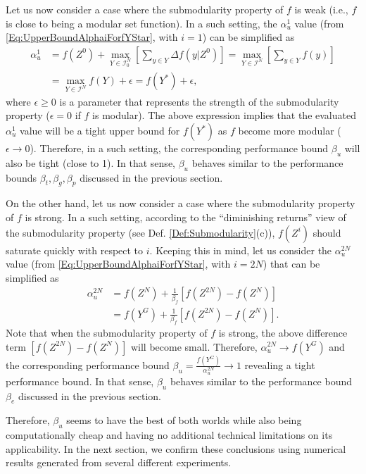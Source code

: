 \documentclass[conference]{IEEEtran}
\begin{document}
Let us now consider a case where the submodularity property of $f$ is weak (i.e., $f$ is close to being a modular set function). In a such setting, the $\alpha^1_u$ value (from \eqref{Eq:UpperBoundAlphaiForfYStar}, with $i=1$) can be simplified as
\begin{align}
    \alpha_u^1 
    &= f(Z^0)+\underset{Y\in\mathcal{I}^N_0}{\max}\left[\sum_{y\in Y}\Delta f(y\vert Z^0)\right] 
    = \underset{Y \in \mathcal{I}^N}{\max} \left[\sum_{y\in Y} f(y) \right]\nonumber \\
    &= \underset{Y \in \mathcal{I}^N}{\max} f(Y) + \epsilon = f(Y^*) + \epsilon, \nonumber
\end{align}
where $\epsilon\geq0$ is a parameter that represents the strength of the submodularity property ($\epsilon = 0$ if $f$ is modular). The above expression implies that the evaluated $\alpha_u^1$ value will be a tight upper bound for $f(Y^*)$ as $f$ become more modular ($\epsilon\rightarrow 0$). Therefore, in a such setting, the corresponding performance bound $\beta_u$ will also be tight (close to 1). In that sense, $\beta_u$ behaves similar to the performance bounds $\beta_t,\beta_g,\beta_p$ discussed in the previous section. 



On the other hand, let us now consider a case where the submodularity property of $f$ is strong. In a such setting, according to the ``diminishing returns'' view of the submodularity property (see Def. \ref{Def:Submodularity}(c)), $f(Z^i)$ should saturate quickly with respect to $i$. Keeping this in mind, let us consider the $\alpha^{2N}_u$ value (from \eqref{Eq:UpperBoundAlphaiForfYStar}, with $i=2N$) that can be simplified as 
\begin{align}
    \alpha^{2N}_u &= f(Z^N) + \frac{1}{\beta_f}\left[f(Z^{2N})-f(Z^{N})\right]\nonumber\\ 
    &= f(Y^G) + \frac{1}{\beta_f}\left[f(Z^{2N})-f(Z^{N})\right].\nonumber
\end{align}
Note that when the submodularity property of $f$ is strong, the above difference term $\left[f(Z^{2N})-f(Z^{N})\right]$ will become small. Therefore, $\alpha_u^{2N}\rightarrow f(Y^G)$ and the corresponding performance bound $\beta_u = \frac{f(Y^G)}{\alpha_u^{2N}}\rightarrow 1$ revealing a tight performance bound. In that sense, $\beta_u$ behaves similar to the performance bound $\beta_e$ discussed in the previous section. 


Therefore, $\beta_u$ seems to have the best of both worlds while also being computationally cheap and having no additional technical limitations on its applicability. In the next section, we confirm these conclusions using numerical results generated from several different experiments. 
\end{document}
